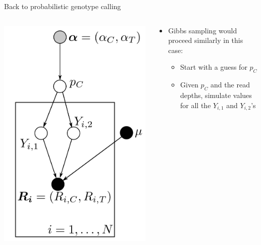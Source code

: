 \documentclass[letter,graphicx]{beamer}
\begin{document}
\begin{frame}{Back to probabilistic genotype calling}
\begin{columns}
    \begin{column}{0.31\textwidth}
        \includegraphics[width=1.0\textwidth]{../diagrams/prob-geno-calling.png}
    \end{column}
    \begin{column}{0.69\textwidth}
    	\begin{itemize}
		\item Gibbs sampling would proceed similarly in this case:
		\begin{itemize}
		\item Start with a guess for $p_C$
		\item Given $p_C$ and the read depths, simulate values for all the $Y_{i,1}$ and $Y_{i,2}$'s

\end{itemize}
\end{itemize}
\end{column}
\end{columns}
\end{frame}
\end{document}
